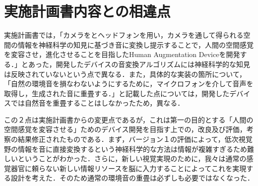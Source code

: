 \section{実施計画書内容との相違点}
実施計画書では，「カメラをとヘッドフォンを用い，カメラを通して得られる空間の情報を神経科学の知見に基づき音に変換し提示することで，人間の空間感覚を変容させ，進化させることを目指したHuman Augmentation Deviceを開発する．」とあった，開発したデバイスの音変換アルゴリズムには神経科学的な知見は反映されていないという点で異なる．また，具体的な実装の箇所について，「自然の環境音を損なわないようにするために，マイクロフォンを介して音声を取得し，生成された音に重畳する．」と記載した点については，開発したデバイスでは自然音を重畳することはしなかったため，異なる．

この２点は実施計画書からの変更点であるが，これは第一の目的とする「人間の空間感覚を変容させる」ためのデバイス開発を目指す上での，改良及び評価，考察の結果修正されたものである．まず，バージョン１の評価によって，低次視覚野の情報を音に直接変換するという神経科学的な方法は情報が複雑すぎるため難しいということがわかった．さらに，新しい視覚実現のために，我々は通常の感覚器官に頼らない新しい情報リソースを脳に入力することによってこれを実現する設計を考えた．そのため通常の環境音の重畳は必ずしも必要ではなくなった．
